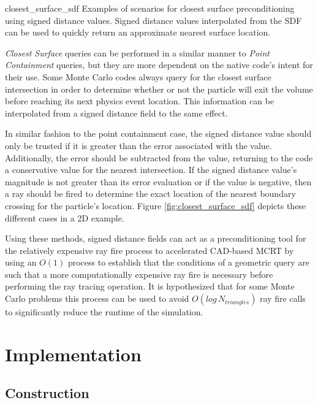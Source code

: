              {closest_surface_sdf}
             {Examples of scenarios for closest surface preconditioning using
               signed distance values. Signed distance values interpolated from
               the SDF can be used to quickly return an approximate nearest
               surface location.}
             {
               \textit{Closest Surface} queries can be performed in a similar manner to
               \textit{Point Containment} queries, but they are more dependent on the
               native code's intent for their use. Some Monte Carlo codes always
               query for the closest surface intersection in order to
               determine whether or not the particle will exit the volume before
               reaching its next physics event location. This information can be
               interpolated from a signed distance field to the same effect.

               In similar fashion to the point containment case, the signed
               distance value should only be trusted if it is greater than the
               error associated with the value. Additionally, the error should
               be subtracted from the value, returning to the code a
               conservative value for the nearest intersection. If the signed
               distance value's magnitude is not greater than its error
               evaluation or if the value is negative, then a ray should be
               fired to determine the exact location of the nearest boundary
               crossing for the particle's location. Figure
               \ref{fig:closest_surface_sdf} depicts these different cases in a
               2D example.
             }

Using these methods, signed distance fields can act as a preconditioning tool
for the relatively expensive ray fire process to accelerated CAD-based MCRT by
using an $O(1)$ process to establish that the conditions of a geometric query
are such that a more computationally expensive ray fire is necessary before
performing the ray tracing operation. It is hypothesized that for some Monte
Carlo problems this process can be used to avoid $O(log \, N_{triangles})$ ray fire calls to
significantly reduce the runtime of the simulation.

\section{Implementation}

\subsection{Construction}

